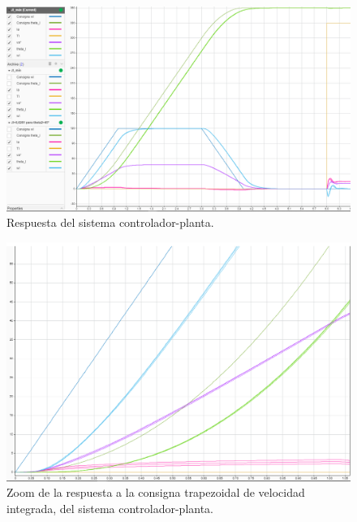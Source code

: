 \documentclass{article}
\begin{document}
\begin{sloppypar}
\begin{figure}[H]
    \centering
    \includegraphics[width=1\textwidth]{Respuesta del sistema controlador-planta}
    \caption{Respuesta del sistema controlador-planta.}
    \label{fig:Respuesta del sistema controlador-planta}
\end{figure}

\begin{figure}[H]
    \centering
    \includegraphics[width=1\textwidth]{Zoom de la respuesta a la consigna trapezoidal de velocidad integrada, del sistema controlador-planta}
    \caption{Zoom de la respuesta a la consigna trapezoidal de velocidad integrada, del sistema controlador-planta.}
    \label{fig:Zoom de la respuesta a la consigna trapezoidal de velocidad integrada, del sistema controlador-planta}
\end{figure}


\end{sloppypar}
\end{document}
